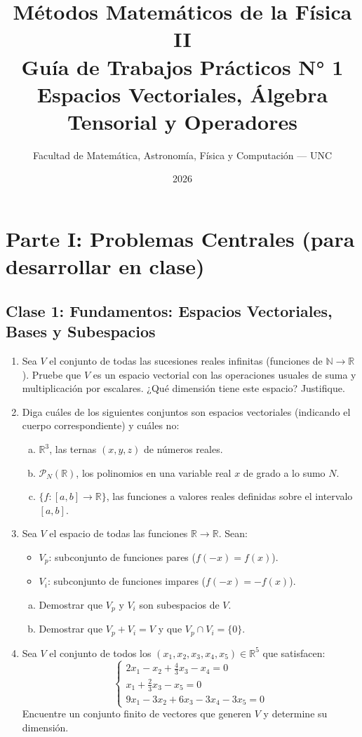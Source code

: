\documentclass[12pt,a4paper]{article}
\title{Métodos Matemáticos de la Física II \\
Guía de Trabajos Prácticos N° 1 \\
\large Espacios Vectoriales, Álgebra Tensorial y Operadores}
\author{Facultad de Matemática, Astronomía, Física y Computación --- UNC}
\date{2026}
\begin{document}
\maketitle


\section*{Parte I: Problemas Centrales (para desarrollar en clase)}

\subsection*{Clase 1: Fundamentos: Espacios Vectoriales, Bases y Subespacios}

\begin{enumerate}[1.]
\item Sea $V$ el conjunto de todas las sucesiones reales infinitas (funciones de $\mathbb{N} \to \mathbb{R}$). Pruebe que $V$ es un espacio vectorial con las operaciones usuales de suma y multiplicación por escalares. ¿Qué dimensión tiene este espacio? Justifique.

\item Diga cuáles de los siguientes conjuntos son espacios vectoriales (indicando el cuerpo correspondiente) y cuáles no:
\begin{enumerate}[a)]
\item $\mathbb{R}^3$, las ternas $(x,y,z)$ de números reales.
\item $\mathcal{P}_N(\mathbb{R})$, los polinomios en una variable real $x$ de grado a lo sumo $N$.
\item $\{f:[a,b]\to\mathbb{R}\}$, las funciones a valores reales definidas sobre el intervalo $[a,b]$.
\end{enumerate}

\item Sea $V$ el espacio de todas las funciones $\mathbb{R}\to\mathbb{R}$. Sean:
\begin{itemize}
\item $V_p$: subconjunto de funciones pares ($f(-x)=f(x)$).
\item $V_i$: subconjunto de funciones impares ($f(-x)=-f(x)$).
\end{itemize}
\begin{enumerate}[a)]
\item Demostrar que $V_p$ y $V_i$ son subespacios de $V$.
\item Demostrar que $V_p + V_i = V$ y que $V_p \cap V_i = \{0\}$.
\end{enumerate}

\item Sea $V$ el conjunto de todos los $(x_1,x_2,x_3,x_4,x_5)\in\mathbb{R}^5$ que satisfacen:
\[
\begin{cases}
2x_1 - x_2 + \frac{4}{3}x_3 - x_4 = 0 \\
x_1 + \frac{2}{3}x_3 - x_5 = 0 \\
9x_1 - 3x_2 + 6x_3 - 3x_4 - 3x_5 = 0
\end{cases}
\]
Encuentre un conjunto finito de vectores que generen $V$ y determine su dimensión.
\end{enumerate}
\end{document}
